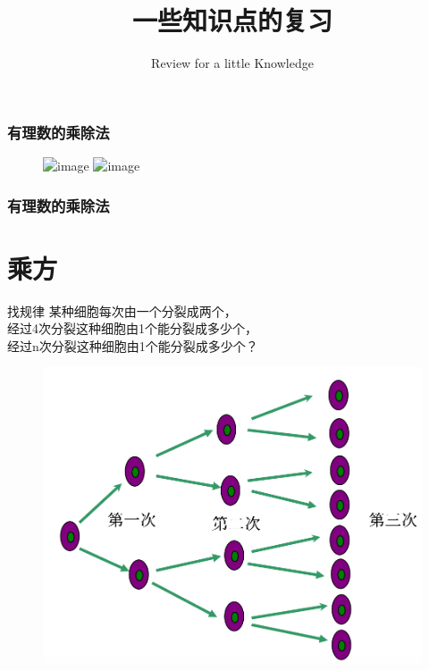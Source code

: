
\usepackage{smartdiagram}

\title{一些知识点的复习}
\subtitle{Review for a little Knowledge}



\frame{\titlepage}

\begin{frame}
    \frametitle{有理数的乘除法}

    \begin{figure}
        \includegraphics<1>[width=.99\textwidth]{assets/17.png}
        \includegraphics<2>[width=.99\textwidth]{assets/18.png}
    \end{figure}
\end{frame}

\begin{frame}
    \frametitle{有理数的乘除法}



    
\end{frame}
\section{乘方}
\begin{frame}{找规律}
    某种细胞每次由一个分裂成两个，\\
    经过4次分裂这种细胞由1个能分裂成多少个，\\
    经过n次分裂这种细胞由1个能分裂成多少个？

    \begin{figure}
        \includegraphics[width=.6\textwidth]{assets/involution.png}
    \end{figure}
\end{frame}

